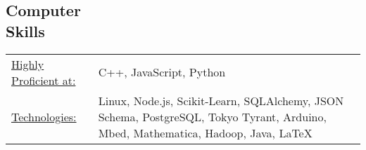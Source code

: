 \documentclass[margin]{res}
\begin{document}
\begin{resume}
\section{Computer \\ Skills}
   \begin{tabular}{l p{3in}}
    \underline{Highly Proficient at:} & C++, JavaScript, Python \\

    \underline{Technologies:} & Linux, Node.js, Scikit-Learn, SQLAlchemy, JSON Schema, PostgreSQL, Tokyo Tyrant, Arduino, Mbed, Mathematica, Hadoop, Java, \LaTeX
 \end{tabular}

\end{resume}
\end{document}
